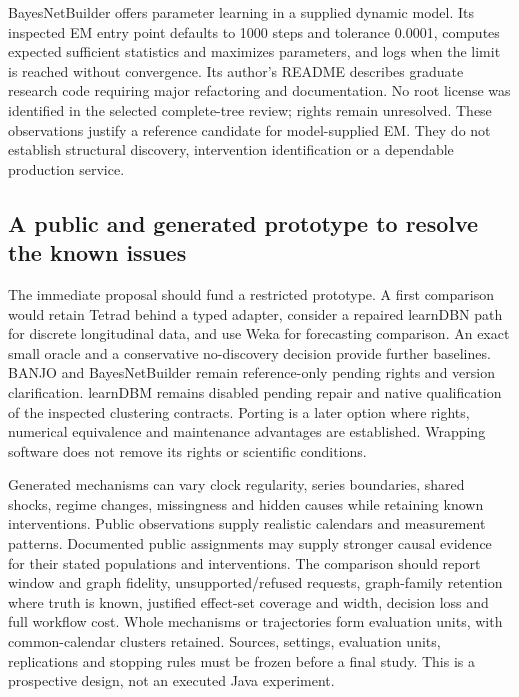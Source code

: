 BayesNetBuilder offers parameter learning in a supplied dynamic model. Its
inspected EM entry point defaults to 1000 steps and tolerance 0.0001, computes
expected sufficient statistics and maximizes parameters, and logs when the
limit is reached without convergence. Its author's README describes graduate
research code requiring major refactoring and documentation. No root license
was identified in the selected complete-tree review; rights remain unresolved.
These observations justify a reference candidate for model-supplied EM. They
do not establish structural discovery, intervention identification or a
dependable production service.~\citep{exec15_javatemporal_builder}

\subsection{A public and generated prototype to resolve the known issues}

The immediate proposal should fund a restricted prototype. A first comparison
would retain Tetrad behind a typed adapter, consider a repaired learnDBN path
for discrete longitudinal data, and use Weka for forecasting comparison. An
exact small oracle and a conservative no-discovery decision provide further
baselines. BANJO and BayesNetBuilder remain reference-only pending rights and
version clarification. learnDBM remains disabled pending repair and native
qualification of the inspected clustering contracts. Porting is a later option
where rights, numerical
equivalence and maintenance advantages are established. Wrapping software
does not remove its rights or scientific conditions.~\citep{exec15_javatemporal_design}

Generated mechanisms can vary clock regularity, series boundaries, shared
shocks, regime changes, missingness and hidden causes while retaining known
interventions. Public observations supply realistic calendars and measurement
patterns. Documented public assignments may supply stronger causal evidence
for their stated populations and interventions. The comparison should report
window and graph fidelity, unsupported/refused requests, graph-family
retention where truth is known, justified effect-set coverage and width,
decision loss and full workflow cost. Whole mechanisms or trajectories form
evaluation units, with common-calendar clusters retained. Sources, settings,
evaluation units, replications and stopping rules must be frozen before a
final study. This is a prospective design, not an executed Java experiment.
\citep{exec15_javatemporal_design}

